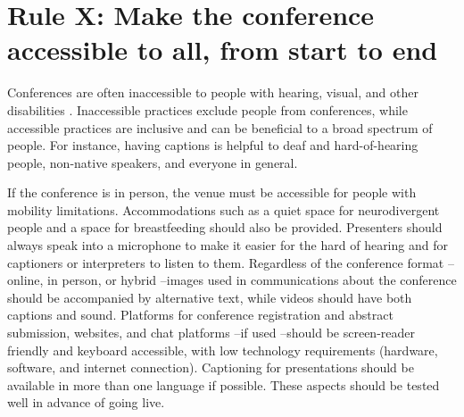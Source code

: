 \documentclass[10pt,letterpaper]{article}
\begin{document}

\section{Rule X: Make the conference accessible to all, from start to end}

Conferences are often inaccessible to people with hearing, visual, and other disabilities \cite{price_access_2009}. %
Inaccessible practices exclude people from conferences, while accessible practices are inclusive and can be beneficial to a broad spectrum of people. For instance, having captions is helpful to deaf and hard-of-hearing people, non-native speakers, and everyone in general. 

If the conference is in person, the venue must be accessible for people with mobility limitations. 
Accommodations such as a quiet space for neurodivergent people and a space for breastfeeding should also be provided.
Presenters should always speak into a microphone to make it easier for the hard of hearing and for captioners or interpreters to listen to them. 
Regardless of the conference format --online, in person, or hybrid --images used in communications about the conference should be accompanied by alternative text, while videos should have both captions and sound. 
Platforms for conference registration and abstract submission, websites, and chat platforms --if used --should be screen-reader friendly and keyboard accessible, with low technology requirements (hardware, software, and internet connection). 
Captioning for presentations should be available in more than one language if possible.
These aspects should be tested well in advance of going live.  
\end{document}
